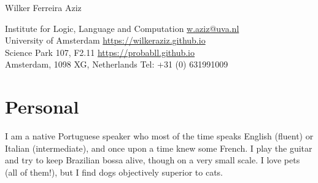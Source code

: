 \documentclass[10pt,a4paper,oneside]{article}
\makeatletter
\newcommand{\myname}{Wilker Ferreira Aziz\xspace}
\newcommand{\birthday}{13/11/1985\xspace}
\newcommand{\location}{S\~ao Paulo, SP -- Brazil\xspace}
\newcommand{\citizenships}{Brazilian\xspace}
\newcommand{\contact}{Institute for Logic, Language and Computation \hfill \url{w.aziz@uva.nl} \\ 
University of Amsterdam \hfill \url{https://wilkeraziz.github.io} \\
Science Park 107, F2.11 \hfill \url{https://probabll.github.io} \\
Amsterdam, 1098 XG, Netherlands  \hfill Tel: +31 (0) 631991009 
}
\makeatother
\begin{document}




\begin{center}
{\large \sc
\myname \\
}
\end{center}



\begin{addmargin}[0em]{2em}%
\contact
\end{addmargin}



















\pagebreak 



%




\section*{Personal}

I am a native Portuguese speaker who most of the time speaks English (fluent) or Italian (intermediate), and once upon a time knew some French. I play the guitar and try to keep Brazilian bossa alive, though on a very small scale. I love pets (all of them!), but I find dogs objectively superior to cats. 
\end{document}
